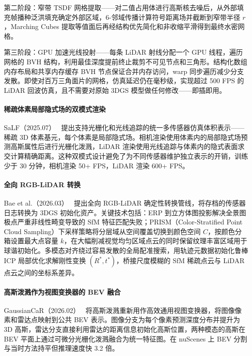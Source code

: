 第二阶段：窄带 TSDF 网格提取——对二值占用体进行高斯核去噪后，从外部填充帧播种泛洪填充确定外部区域，6-邻域传播计算符号距离场并截断到窄带半径 $r$，Marching Cubes 提取等值面后再经结构优先简化和非收缩平滑得到最终水密网格。

第三阶段：GPU 加速光线投射——每条 LiDAR 射线分配一个 GPU 线程，遍历网格的 BVH 结构，利用最佳深度提前终止裁剪不可见节点和三角形。结构化数组内存布局和共享内存缓存 BVH 节点保证合并内存访问，warp 同步遍历减少分支发散。即使对百万三角面片的网格，仿真延迟仍在毫秒级，实现超过 500 FPS 的 LiDAR 回波仿真，且不需要对原始 3DGS 模型做任何修改——即插即用。

\paragraph{稀疏体素局部隐式场的双模式渲染}

SaLF（2025.07）~\cite{2507_18713} 提出支持光栅化和光线追踪的统一多传感器仿真体积表示——稀疏 3D 体素基元，每个体素是局部隐式场。相机渲染使用体素内的局部隐式场预测高斯属性后进行光栅化泼溅，LiDAR 渲染使用光线追踪与体素内的隐式表面求交计算精确距离。这种双模式设计避免了为不同传感器维护独立表示的开销，训练少于 30 分钟，相机渲染 50+ FPS，LiDAR 渲染 600+ FPS。

\paragraph{全向 RGB-LiDAR 转换}

Bae et al.（2026.03）~\cite{2603_06061} 提出全向 RGB-LiDAR 确定性转换管线，将存档的传感器日志转换为 3DGS 初始化资产。关键技术包括：ERP 到立方体图投影解决全景图极点严重非线性畸变导致的 SfM 特征匹配失败；PRISM（Color-Stratified Point Cloud Sampling）下采样策略将分层域从空间覆盖切换到颜色空间 $C$，按颜色分箱设置最大点容量 $k$，在大幅削减视觉均匀区域点云的同时保留纹理丰富区域用于球谐初始化。多模态对齐绕过容易发散的全局配准搜索，用轨迹元数据初始化鲁棒 ICP 局部优化求解刚性变换 $(R^*, t^*)$，桥接尺度模糊的 SfM 稀疏点云与 LiDAR 点云之间的坐标系差异。

\paragraph{高斯泼溅作为视图变换器的 BEV 融合}

GaussianCaR（2026.02）~\cite{2602_08784} 将高斯泼溅重新用作高效通用视图变换器，将图像像素和雷达点映射到公共 BEV 表示。图像分支为每个像素预测深度分布并提升为 3D 高斯，雷达分支直接利用雷达的距离信息初始化高斯位置，两种模态的高斯在 BEV 平面上通过可微分光栅化泼溅融合为统一特征图。在 nuScenes 上 BEV 分割与当时方法持平但推理速度快 3.2 倍。

